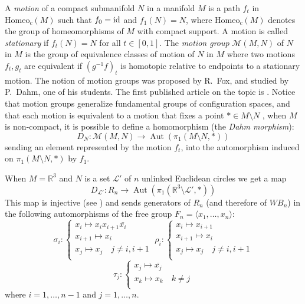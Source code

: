\documentclass[11pt]{amsart}
\begin{document}
A {\emph{{motion}}} of a compact submanifold $N$ in a  manifold $M$ is a path $f_t$
in $\text{Homeo}_c(M)$ such that $f_0=\textup{id}$ and $f_1(N)=N$, where $\text{Homeo}_c(M)$
denotes  the group of homeomorphisms of $M$ with compact support. A
motion is called {\emph{{stationary}}} if $f_t(N)=N$ for all $t\in[0,1]$. The {\emph{{motion
group}}} $\mathcal{M}(M,N)$ of $N$ in $M$ is the group of equivalence classes of
motion of $N$ in $M$  where two motions $f_t,g_t$ are equivalent if
$(g^{-1}f)_t$ is homotopic relative to endpoints to a stationary motion.
The notion of motion groups was proposed by R.~Fox, and studied
by P.~Dahm, one of his students. The first published article on the topic is \cite{G1}.
Notice that motion groups generalize fundamental groups of configuration spaces,
and  that each motion is equivalent to a motion that fixes
a point $*\in M \setminus N$ , when $M$ is non-compact, it is possible to define a homomorphism
(the \emph{Dahm morphism}):
\begin{equation*}
D_N: \mathcal{M}(M,N)\to {\mathop{\mathrm{Aut}}\nolimits}(\pi_1(M \setminus N,*))
\end{equation*}
 sending an element represented by the motion $f_t$, into the automorphism
induced on $\pi_1(M\setminus N,*)$ by $f_1$.

When $M={\mathbb{R}}^3$ and $N$ is a set $\mathcal{L}'$ of $n$ unlinked Euclidean circles 
we get a map 
\begin{equation*}
D_{\mathcal{L}'}:R_n \to {\mathop{\mathrm{Aut}}\nolimits}(\pi_1({\mathbb{R}}^3 \setminus \mathcal{L}',*))
\end{equation*}
This map is injective (see \cite{G1}) and sends generators of $R_n$ (and therefore of $WB_n$) in 
 the following  automorphisms of the free group $F_n=\langle x_1, \ldots, x_n \rangle$: 
$$\sigma_i : 
\left\{\begin{array}{l}
x_i \mapsto x_{i} x_{i+1} {\bar{{x_{i}}}} \\
x_{i+1} \mapsto x_i \\
x_{j} \mapsto x_j \quad j \neq i,i+1\\     
\end{array}\right.
\; 
\rho_i : 
\left\{\begin{array}{l}
x_i \mapsto   x_{i+1}   \\
x_{i+1} \mapsto x_i \\
x_{j} \mapsto x_j \quad  j \neq i,i+1\\       
\end{array}\right.
$$
$$
\tau_j : 
\left\{\begin{array}{l}
x_j \mapsto   {\bar{{x_j}}}   \\
x_{k} \mapsto x_k \quad   k \neq j\\       
\end{array}\right.$$ 
where $i=1,\ldots, n-1$ and $j=1,\ldots, n$.
 
\end{document}
